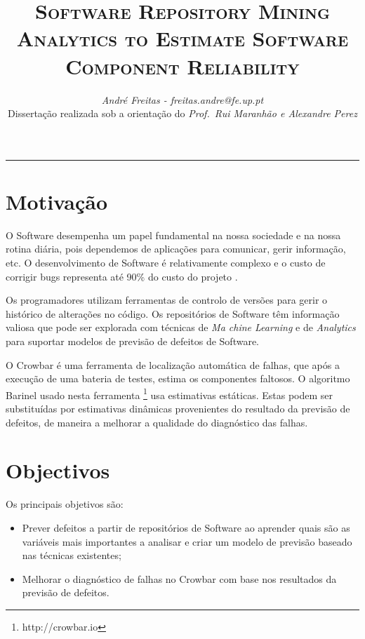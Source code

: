 \documentclass[9pt,a4paper]{extarticle}
\begin{document}
\title{\vspace*{-8mm}\textbf{\textsc{Software Repository Mining Analytics to Estimate Software Component Reliability}}}
\author{\emph{André Freitas - freitas.andre@fe.up.pt}\\[2mm]
\small{Dissertação realizada sob a orientação do \emph{Prof.\ Rui Maranhão e Alexandre Perez}}}
\date{}
\maketitle
\thispagestyle{empty}

\vspace*{-4mm}\noindent\rule{\textwidth}{0.4pt}\vspace*{4mm}

\begin{multicols}{2}

\section{Motivação}\label{sec:motiva}
O Software desempenha um papel fundamental na nossa sociedade e na nossa rotina
diária, pois dependemos de aplicações para comunicar, gerir informação, etc.
O desenvolvimento de Software é relativamente complexo e o custo de
corrigir bugs representa até 90\% do custo do projeto \cite{Servant1}.

Os programadores utilizam ferramentas de controlo de versões para gerir o
histórico de alterações no código. Os repositórios de Software têm informação
valiosa que pode ser explorada com técnicas de \emph{Ma
chine Learning}
e de \emph{Analytics} para suportar modelos de previsão de defeitos de Software.

O Crowbar é uma ferramenta de localização automática de falhas, que após a
execução de uma bateria de testes, estima os componentes faltosos. O algoritmo
Barinel usado nesta ferramenta \footnote{http://crowbar.io} usa estimativas
estáticas. Estas podem ser substituídas por estimativas dinâmicas provenientes
do resultado da previsão de defeitos, de maneira a melhorar a qualidade do
diagnóstico das falhas.


\section{Objectivos}\label{sec:goals}

Os principais objetivos são:

\begin{itemize}
\item Prever defeitos a partir de repositórios de Software ao aprender quais
são as variáveis mais importantes a analisar e criar um modelo de previsão
baseado nas técnicas existentes;
\item Melhorar o diagnóstico de falhas no Crowbar com base nos resultados da
previsão de defeitos.
\end{itemize}


\end{multicols}
\end{document}
